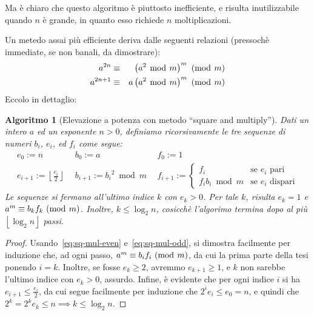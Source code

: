 \documentclass[pdflatex,11pt,a4paper,oneside]{article}
\newcommand{\p}[1]{\left({#1}\right)}
\newcommand{\floor}[1]{\left\lfloor{#1}\right\rfloor}
\newcommand{\congruent}[0]{\equiv}
\newcommand{\mmodop}[0]{\ensuremath{\operatorname{mod}}}
\newcommand{\mmod}[1]{\ensuremath{\allowbreak\ (\mmodop\:{#1})}}
\newcommand{\rem}[2]{\ensuremath{{#1}\:\mmodop\:{#2}}}
\newtheorem{algorithm}[TheoremLike]{Algoritmo}
\begin{document}
Ma \`e chiaro che questo algoritmo \`e piuttosto inefficiente, e risulta
inutilizzabile quando $n$ \`e grande, in quanto esso richiede $n$
moltiplicazioni.

Un metedo assai pi\`u efficiente deriva dalle seguenti relazioni
(pressoch\`e immediate, se non banali, da dimostrare):
\begin{eqnarray}
  a^{2n}   & \congruent & \p{\rem{a^2}{m}}^m \mmod m
    \label{eq:sq-mul-even}
  \\
  a^{2n+1} & \congruent & a \p{\rem{a^2}{m}}^m \mmod m
    \label{eq:sq-mul-odd}
\end{eqnarray}
%
Eccolo in dettaglio:
\begin{algorithm}[Elevazione a potenza con metodo ``square and multiply'']
\label{alg:square-and-multiply}
Dati un intero $a$ ed un esponente $n > 0$, definiamo ricorsivamente le
tre sequenze di numeri $b_i$, $e_i$, ed $f_i$ come segue:
\begin{displaymath}
  \begin{array}{lll}
    e_0 := n &
    b_0 := a &
    f_0 := 1
  \\
    e_{i+1} := \floor{\frac{e_i}{2}} ~~ &
    b_{i+1} := \rem{{b_i}^2}{m} ~~ &
    f_{i+1} := \begin{cases}
             f_i & \text{se $e_i$ pari} \\
             \rem{f_i b_i}{m} & \text{se $e_i$ dispari}
           \end{cases}
  \end{array}
\end{displaymath}
Le sequenze si fermano all'ultimo indice $k$ con $e_k > 0$.  Per tale
$k$, risulta $e_k = 1$ e $a^m \congruent b_k f_k \mmod m$.  Inoltre,
$k \leq \log_2 n$, cosicch\`e l'algorimo termina dopo al pi\`u\,
$\floor{\log_2 n}$ passi.
\end{algorithm}

\begin{proof}
Usando~\eqref{eq:sq-mul-even} e~\eqref{eq:sq-mul-odd}, si dimostra
facilmente per induzione che, ad ogni passo, $a^m \congruent b_i f_i
\mmod m$, da cui la prima parte della tesi ponendo $i = k$.  Inoltre,
se fosse $e_k \geq 2$, avremmo $e_{k+1} \geq 1$, e $k$ non sarebbe
l'ultimo indice con $e_k > 0$, assurdo.  Infine, \`e evidente che
per ogni indice $i$ si ha $e_{i+1} \leq \frac{e_i}{2}$, da cui segue
facilmente per induzione che $2^i e_i \leq e_0 = n$, e quindi che
$2^k = 2^k e_k \leq n \implies k \leq \log_2 n$.
\end{proof}
\end{document}
